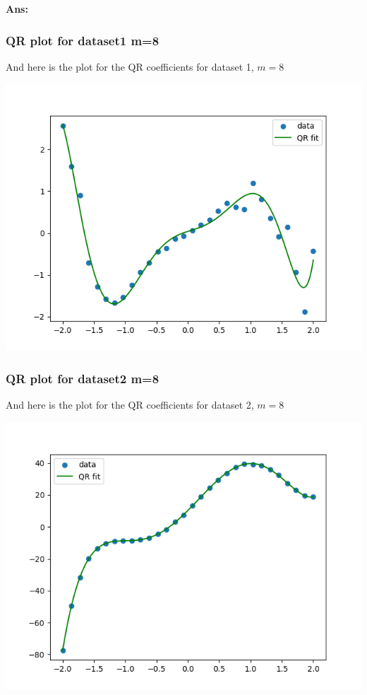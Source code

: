 \documentclass[11pt]{article}
\newenvironment{solbox}
  {\begin{mdframed}[linewidth=1pt,linecolor=black,roundcorner=5pt]
   \noindent\textbf{Ans: }\enspace}
  {\end{mdframed}}
\begin{document}
\begin{solbox}
    \subsubsection{QR plot for dataset1 m=8}
    And here is the plot for the QR coefficients for dataset 1, $ m=8 $ 

    \begin{center}
    \includegraphics[width=0.75\linewidth]{../Figures/M8QR_plot_dataset1.png}
    \end{center}
    

    \subsubsection{QR plot for dataset2 m=8}
    And here is the plot for the QR coefficients for dataset 2, $ m=8 $ 
    
    
    \begin{center}
    \includegraphics[width=0.75\linewidth]{../Figures/M8QR_plot_dataset2.png}
    \end{center}

\end{solbox}
\end{document}
